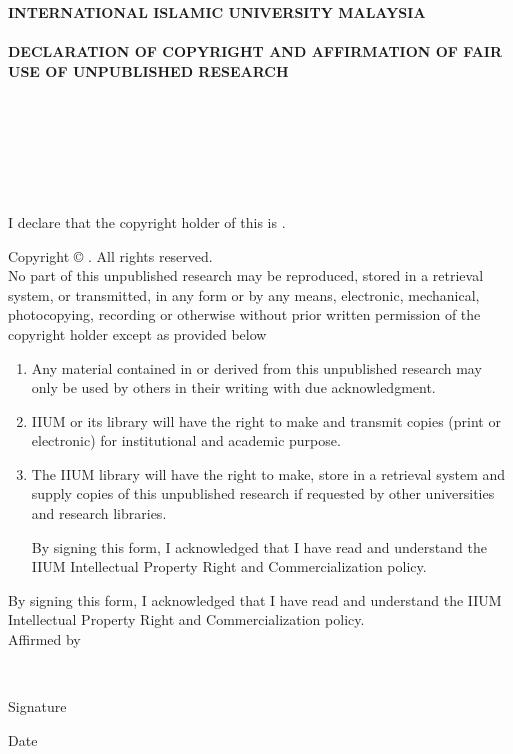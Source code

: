 \documentclass[12pt, a4paper]{memoir}
\begin{document}
\thispagestyle{empty}

\begin{center}
\begin{Large}
\textbf{\MakeUppercase{International Islamic University Malaysia}}\\~\\
\textbf{\MakeUppercase{Declaration of Copyright and Affirmation of Fair Use of 
Unpublished Research}}\\~\\
\textbf{\MakeUppercase{\myTitle}}\\
\ifdefined\mySubtitle
\textbf{\MakeUppercase{\mySubtitle}}\\~\\
\else
\\~\\
\fi
\end{Large}
\noindent I declare that the copyright holder of this \myDocument is 
\myName.\\
\end{center}

{\fontsize{10bp}{12bp}\selectfont
\noindent Copyright \copyright{} \myYear \myName. All rights reserved.}\\

\noindent No part of this unpublished research may be reproduced, stored in a 
retrieval
system, or transmitted, in any form or by any means, electronic, mechanical,
photocopying, recording or otherwise without prior written permission of the
copyright holder except as provided below

\begin{enumerate}
\item Any material contained in or derived from this unpublished research
may only be used by others in their writing with due acknowledgment.

\item IIUM or its library will have the right to make and transmit copies
(print or electronic) for institutional and academic purpose.

\item The IIUM library will have the right to make, store in a retrieval system
and supply copies of this unpublished research if requested by other
universities and research libraries.

By signing this form, I acknowledged that I have read and understand the
IIUM Intellectual Property Right and Commercialization policy.
\end{enumerate}

\noindent By signing this form, I acknowledged that I have read and understand 
the
IIUM Intellectual Property Right and Commercialization policy.\\[48pt]

\noindent Affirmed by \myName\\

\vfill

\noindent \makebox[2in]{\dotfill} \hfill \makebox[2in]{\dotfill}\\
\parbox{2in}{\centering Signature} \hfill \parbox{2in}{\centering Date}
\end{document}
